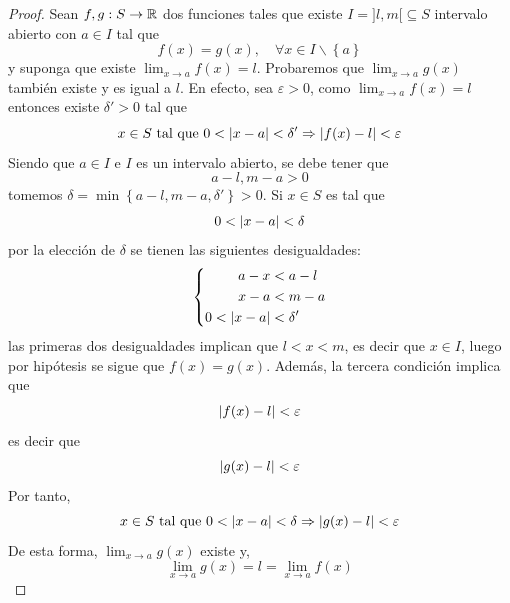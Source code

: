 \documentclass[12pt]{article}
\begin{document}
\begin{enumerate}
    \begin{proof}
        Sean $f,g:S\rightarrow\mathbb{R}$ dos funciones tales que existe $I=]l,m[\subseteq S$ intervalo abierto con $a\in I$ tal que
        \begin{equation*}
            f(x)=g(x),\quad\forall x\in I\backslash\left\{a\right\}
        \end{equation*}
        y suponga que existe $\lim_{ x\rightarrow a}f(x)=l$. Probaremos que $\lim_{ x\rightarrow a}g(x)$ también existe y es igual a $l$. En efecto, sea $\varepsilon>0$, como $\lim_{ x\rightarrow a}f(x)=l$ entonces existe $\delta'>0$ tal que
        \begin{equation*}
            x\in S\textup{ tal que }0<\left| x-a \right|<\delta'\Rightarrow\left| f(x)-l \right|<\varepsilon
        \end{equation*}
        Siendo que $a\in I$ e $I$ es un intervalo abierto, se debe tener que
        \begin{equation*}
            a-l,m-a>0
        \end{equation*}
        tomemos $\delta=\min\left\{a-l,m-a,\delta' \right\}>0$. Si $x\in S$ es tal que
        \begin{equation*}
            0<\left| x-a \right|<\delta
        \end{equation*}
        por la elección de $\delta$ se tienen las siguientes desigualdades:
        \begin{equation*}
            \left\{
                \begin{split}
                    a-x&<a-l\\
                    x-a&<m-a\\
                    0<\left| x-a \right|&<\delta'\\
                \end{split}
            \right.
        \end{equation*}
        las primeras dos desigualdades implican que $l<x<m$, es decir que $x\in I$, luego por hipótesis se sigue que $f(x)=g(x)$. Además, la tercera condición implica que
        \begin{equation*}
            \left| f(x)-l \right|<\varepsilon
        \end{equation*} 
        es decir que
        \begin{equation*}
            \left| g(x)-l \right|<\varepsilon
        \end{equation*}
        Por tanto,
        \begin{equation*}
            x\in S\textup{ tal que }0<\left| x-a \right|<\delta\Rightarrow\left| g(x)-l \right|<\varepsilon
        \end{equation*}
        De esta forma, $\lim_{ x\rightarrow a}g(x)$ existe y,
        \begin{equation*}
            \lim_{ x\rightarrow a}g(x)=l=\lim_{ x\rightarrow a}f(x)
        \end{equation*}
    \end{proof}


\end{enumerate}
\end{document}
